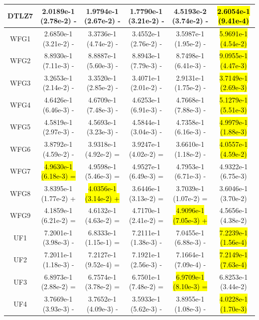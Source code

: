\documentclass[journal]{IEEEtran}
\begin{document}
\begin{table}[]
\begin{tabular}{cccccc}
    DTLZ7   & 2.0189e-1 (2.78e-2) -      & 1.9794e-1 (2.67e-2) -      & 1.7790e-1 (3.21e-2) -      & 4.5193e-2 (3.74e-2) -      & \hl{2.6054e-1 (9.41e-4)} \\
    \hline
    WFG1    & 2.6850e-1 (3.21e-2) -      & 3.3736e-1 (4.74e-2) -      & 3.4552e-1 (2.76e-2) -      & 3.5987e-1 (1.95e-2) -      & \hl{5.9691e-1 (4.54e-2)} \\
    WFG2    & 8.8930e-1 (7.11e-3) -      & 8.8887e-1 (5.60e-3) -      & 8.8943e-1 (7.79e-3) -      & 8.7498e-1 (6.41e-3) -      & \hl{9.0955e-1 (4.47e-3)} \\
    WFG3    & 3.2653e-1 (2.14e-2) -      & 3.3520e-1 (2.85e-2) -      & 3.4071e-1 (2.01e-2) -      & 2.9131e-1 (1.75e-2) -      & \hl{3.7149e-1 (2.69e-3)} \\
    WFG4    & 4.6426e-1 (6.46e-3) -      & 4.6709e-1 (7.48e-3) -      & 4.6253e-1 (6.91e-3) -      & 4.7668e-1 (7.88e-3) -      & \hl{5.1279e-1 (5.51e-3)} \\
    WFG5    & 4.5819e-1 (2.97e-3) -      & 4.5693e-1 (3.23e-3) -      & 4.5844e-1 (3.04e-3) -      & 4.7358e-1 (6.16e-3) -      & \hl{4.9979e-1 (1.88e-3)} \\
    WFG6    & 3.8792e-1 (4.59e-2) -      & 3.9318e-1 (4.92e-2) =      & 3.9247e-1 (4.02e-2) =      & 3.6610e-1 (1.18e-2) -      & \hl{4.0557e-1 (4.59e-2)} \\
    WFG7    & \hl{4.9630e-1 (6.18e-3) =} & 4.9598e-1 (5.46e-3) =      & 4.9527e-1 (6.49e-3) =      & 4.7953e-1 (6.71e-3) -      & 4.9322e-1 (6.75e-3)      \\
    WFG8    & 3.8395e-1 (1.77e-2) +      & \hl{4.0356e-1 (3.14e-2) +} & 3.6446e-1 (3.13e-2) =      & 3.7039e-1 (1.07e-2) =      & 3.6046e-1 (3.70e-2)      \\
    WFG9    & 4.1859e-1 (6.21e-2) =      & 4.6132e-1 (4.63e-2) =      & 4.7170e-1 (2.41e-2) =      & \hl{4.9096e-1 (7.05e-3) +} & 4.5656e-1 (4.38e-2)      \\
    \hline
    UF1     & 7.2001e-1 (3.98e-3) -      & 6.8333e-1 (1.15e-1) =      & 7.2111e-1 (1.38e-3) -      & 7.0455e-1 (6.88e-3) -      & \hl{7.2239e-1 (1.56e-4)} \\
    UF2     & 7.2011e-1 (1.18e-3) -      & 7.2127e-1 (9.52e-4) =      & 7.1921e-1 (2.56e-3) -      & 7.1664e-1 (7.09e-4) -      & \hl{7.2149e-1 (7.63e-4)} \\
    UF3     & 6.8973e-1 (2.88e-2) =      & 6.7574e-1 (3.78e-2) =      & 6.7501e-1 (7.48e-2) =      & \hl{6.9709e-1 (8.10e-3) =} & 6.8253e-1 (3.44e-2)      \\
    UF4     & 3.7669e-1 (3.93e-3) -      & 3.7652e-1 (4.09e-3) -      & 3.5933e-1 (5.62e-3) -      & 3.8955e-1 (1.08e-3) -      & \hl{4.0228e-1 (1.70e-3)} \\

\end{tabular}
\end{table}
\end{document}
